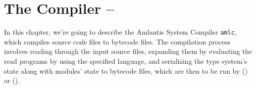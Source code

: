 
\chapter[The Compiler -- amlc]{The Compiler -- \ToolAmlc}
\label{ch:tools-amlc}

In this chapter, we're going to describe the Amlantis System Compiler \lstinline!amlc!, which compiles source code files to bytecode files. The compilation process involves reading through the input source files, expanding them by evaluating the read programs by using the specified language, and serializing the type system's state along with modules' state to bytecode files, which are then to be run by \ToolAmlrun () or \ToolAml ().







